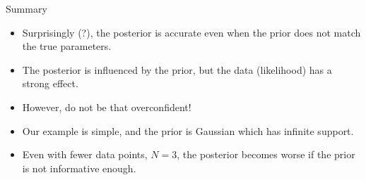 \documentclass{beamer}
\begin{document}
\begin{frame}{Summary}
  \begin{itemize}
  \item Surprisingly (?), the posterior is accurate even when the prior does not match the true parameters.
  \item The posterior is influenced by the prior, but the data (likelihood) has a strong effect.
  \item However, do not be that overconfident!
  \item Our example is simple, and the prior is Gaussian which has infinite support.
  \item Even with fewer data points, $N=3$, the posterior becomes worse if the prior is not informative enough.
  \end{itemize}
\end{frame}
\end{document}
